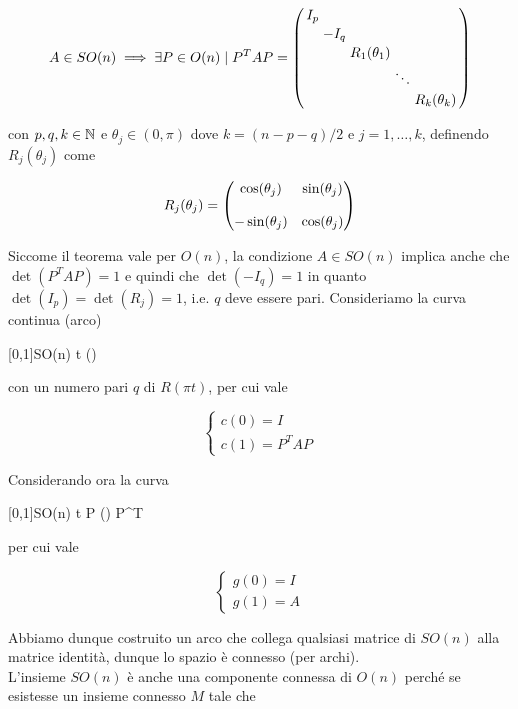 \begin{equation}
	A \in SO(n) \implies %
	\exists P \in O(n) \mid P^{T} A P = %
	\smqty(\dmat{ I_{p}, - I_{q}, R_{1}(\theta_{1}), \ddots, R_{k}(\theta_{k}) })
\end{equation}

con $ p,q,k \in \mathbb{N} $ e $ \theta_{j} \in (0,\pi) $ dove $ k = (n-p-q)/2 $ e $ j=1,\dots,k $, definendo $ R_{j}(\theta_{j}) $ come

\begin{equation}
	R_{j}(\theta_{j}) = \mqty(\dmat{ \cos(\theta_{j}) & \sin(\theta_{j}) \\\\ - \sin(\theta_{j}) & \cos(\theta_{j}) })
\end{equation}

Siccome il teorema vale per $ O(n) $, la condizione $ A \in SO(n) $ implica anche che $ \det(P^{T} A P) = 1 $ e quindi che $ \det(-I_{q}) = 1 $ in quanto $ \det(I_{p}) = \det(R_{j}) = 1 $, i.e. $ q $ deve essere pari. Consideriamo la curva continua (arco)

%
	{[0,1]}{SO(n)}%
	{t}{%
		\mqty()
		}

con un numero pari $ q $ di $ R(\pi t) $, per cui vale

\begin{equation}
	\begin{cases}
		c(0) = I\\
		c(1) = P^{T} A P
	\end{cases}
\end{equation}

Considerando ora la curva

%
	{[0,1]}{SO(n)}%
	{t}{%
		P \mqty() P^{T}
	}

per cui vale

\begin{equation}
	\begin{cases}
		g(0) = I\\
		g(1) = A
	\end{cases}
\end{equation}

Abbiamo dunque costruito un arco che collega qualsiasi matrice di $ SO(n) $ alla matrice identità, dunque lo spazio è connesso (per archi).\\
L'insieme $ SO(n) $ è anche una componente connessa di $ O(n) $ perché se esistesse un insieme connesso $ M $ tale che

